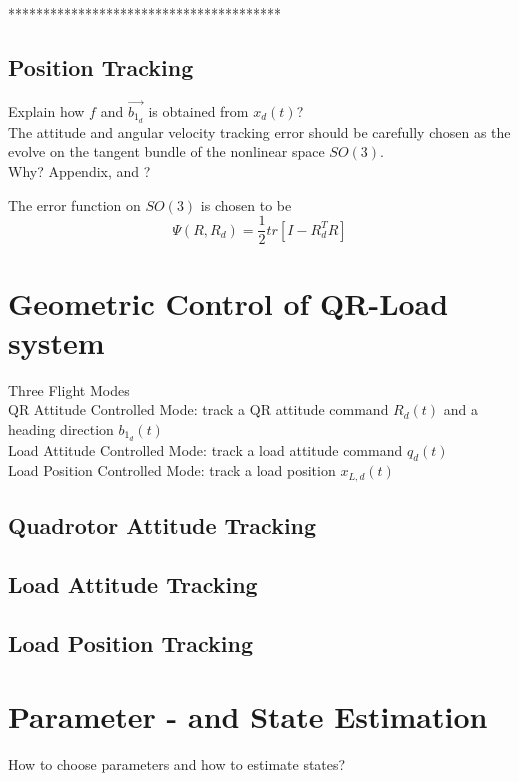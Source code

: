 		***************************************\\

		\subsection{Position Tracking}
		
		
		Explain how $ f $ and $ \vec{b_{1_d}} $ is obtained from $ x_d(t) $?\\
		
		The attitude and angular velocity tracking error should be carefully chosen as the evolve on the tangent bundle of the nonlinear space $ SO(3) $. \cite{Lee2010}\\
		Why? Appendix\cite{Lee2010}, and \cite{Bullo2005}?
		
		The error function on $ SO(3) $ is chosen to be \cite{Lee2010}
		\begin{equation}\label{eq:errorfunc}
		\Psi(R,R_d)=\frac{1}{2}tr\left[I-R_d^TR\right]
		\end{equation}

\section{Geometric Control of QR-Load system}
Three Flight Modes\\
QR Attitude Controlled Mode: track a QR attitude command $ R_d(t) $ and a heading direction $ b_{1_d}(t) $ \\
Load Attitude Controlled Mode: track a load attitude command $ q_d(t) $ \\
Load Position Controlled Mode: track a load position $ x_{L,d}(t) $\\

		\subsection{Quadrotor Attitude Tracking}

		\subsection{Load Attitude Tracking}
		
		\subsection{Load Position Tracking}

\section{Parameter - and State Estimation}
How to choose parameters and how to estimate states?


